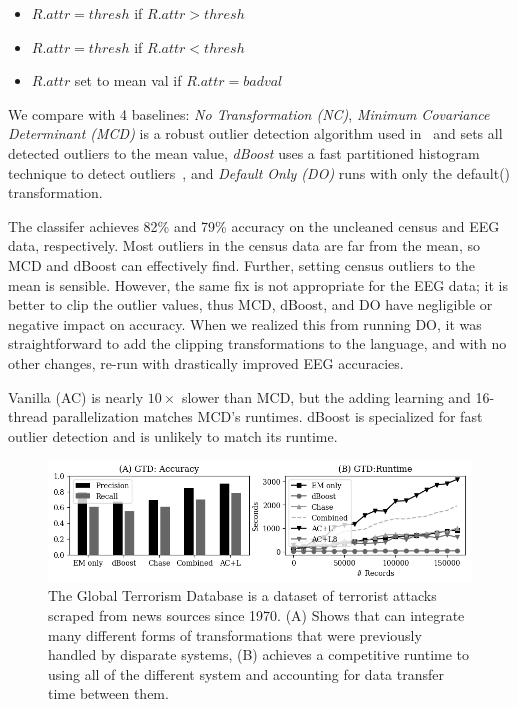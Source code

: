 {\small
\begin{itemize}[leftmargin=*, topsep=0mm, itemsep=0mm]
  \item {} $R.attr = thresh$ if $R.attr>thresh$
  \item {} $R.attr = thresh$ if $R.attr<thresh$
  \item {} $R.attr$ set to mean val if $R.attr=badval$
\end{itemize}
}

 We compare with 4 baselines: {\it No Transformation (NC)}, {\it Minimum Covariance Determinant (MCD)} is a robust outlier detection algorithm used in~\cite{bailis2016macrobase} and sets all detected outliers to the mean value, {\it dBoost} uses a fast partitioned histogram technique to detect outliers~\cite{mariet2016outlier}, and {\it Default Only (DO)} runs \sys with only the \textsf{default()} transformation.  

 The classifer achieves 82\% and 79\% accuracy on the uncleaned census and EEG data, respectively.  Most outliers in the census data are far from the mean, so MCD and dBoost can effectively find.  Further, setting census outliers to the mean is sensible. However, the same fix is not appropriate for the EEG data; it is better to clip the outlier values, thus MCD, dBoost, and DO have negligible or negative impact on accuracy.  When we realized this from running DO, it was straightforward to add the clipping transformations to the language, and with no other changes, re-run \sys with drastically improved EEG accuracies.  

Vanilla \sys (AC) is nearly $10\times$ slower than MCD, but the adding learning and 16-thread parallelization  matches MCD's runtimes.  dBoost is specialized for fast outlier detection and \sys is unlikely to match its runtime.  


\begin{figure}[ht]
    \centering
    \includegraphics[width=\columnwidth]{exp/exp7.png}
    \caption{The Global Terrorism Database is a dataset of terrorist attacks scraped from news sources since 1970. (A) Shows that \sys can integrate many different forms of transformations that were previously handled by disparate systems, (B) \sys achieves a competitive runtime to using all of the different system and accounting for data transfer time between them. \label{exp7a}}
\end{figure}

